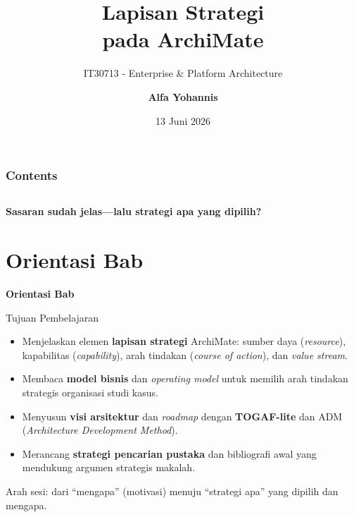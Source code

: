 \documentclass[aspectratio=169, table]{beamer}
\title{\huge Lapisan Strategi\\
  \vspace{8pt} 
  pada ArchiMate}
\subtitle{IT30713 - Enterprise \& Platform Architecture}
\author{\textbf{Alfa Yohannis}}
\date{13 Juni 2026}
\newcommand{\sectionframe}[1]{%
  \begin{frame}{\hfill}
    \centering
    \Huge{\textbf{#1}}
  \end{frame}
}
\newcommand{\takeaway}[1]{%
  \vspace{4pt}
  {\footnotesize #1}
}
\begin{document}
\frame{\titlepage}

\begin{frame}[fragile]
  \frametitle{Contents}
  \vspace{20pt}
  \begin{columns}[t]
    \tableofcontents[sections={1-4}]

    \tableofcontents[sections={5-8}]
  \end{columns}
\end{frame}

\begin{frame}{\hfill}
  \centering
  \Huge{\textbf{Sasaran sudah jelas---lalu strategi apa yang dipilih?}}
\end{frame}

\section{Orientasi Bab}
\sectionframe{Orientasi Bab}

\begin{frame}{Tujuan Pembelajaran}
  \vspace{8pt}
  \begin{itemize}
    \item Menjelaskan elemen \textbf{lapisan strategi} ArchiMate: sumber daya
          (\emph{resource}), kapabilitas (\emph{capability}), arah tindakan
          (\emph{course of action}), dan \emph{value stream}.
    \item Membaca \textbf{model bisnis} dan \emph{operating model} untuk memilih
          arah tindakan strategis organisasi studi kasus.
    \item Menyusun \textbf{visi arsitektur} dan \emph{roadmap} dengan
          \textbf{TOGAF-lite} dan ADM (\emph{Architecture Development Method}).
    \item Merancang \textbf{strategi pencarian pustaka} dan bibliografi awal
          yang mendukung argumen strategis makalah.
  \end{itemize}
  \takeaway{Arah sesi: dari ``mengapa'' (motivasi) menuju ``strategi apa''
  yang dipilih dan mengapa.}
\end{frame}
\end{document}
